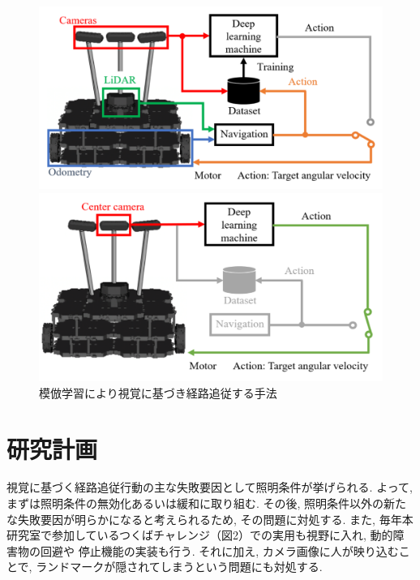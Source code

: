 \documentclass{jsarticle}
\begin{document}
\begin{figure}[htbp]
  \begin{minipage}[t]{0.5\linewidth}
    \centering
    \includegraphics[keepaspectratio, scale=0.32]{fig/lm1.pdf}
  \end{minipage}
  \begin{minipage}[t]{0.5\linewidth}
    \centering
    \includegraphics[keepaspectratio, scale=0.32]{fig/lm2.pdf}
  \end{minipage}\vspace*{2mm}
  \caption{模倣学習により視覚に基づき経路追従する手法}
\end{figure}

\section{研究計画}
視覚に基づく経路追従行動の主な失敗要因として照明条件が挙げられる. 
よって, まずは照明条件の無効化あるいは緩和に取り組む. 
その後, 照明条件以外の新たな失敗要因が明らかになると考えられるため, 
その問題に対処する. 
また, 毎年本研究室で参加しているつくばチャレンジ（図2）での実用も視野に入れ, 動的障害物の回避や
停止機能の実装も行う. 
それに加え, カメラ画像に人が映り込むことで, ランドマークが隠されてしまうという問題にも対処する.
\end{document}
